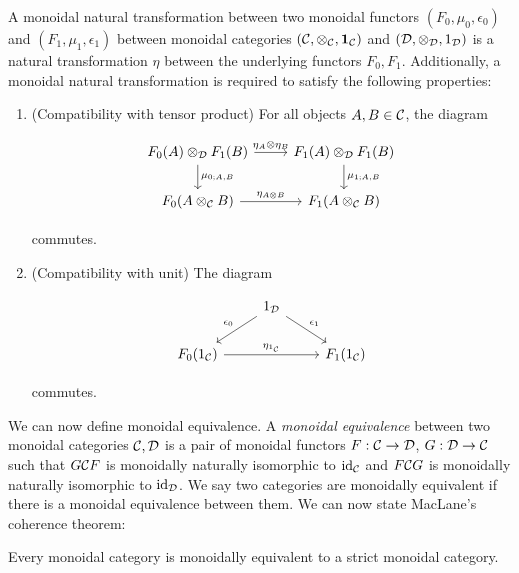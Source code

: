 \begin{defn} A monoidal natural transformation between two monoidal functors $(F_0,\mu_0,\epsilon_0)$ and $(F_1,\mu_1,\epsilon_1)$ between monoidal categories $({\mathcal C},\otimes_{{\mathcal C}},{\mathbf 1}_{{\mathcal C}})$ and $({\mathcal D},\otimes_{{\mathcal D}},1_{{\mathcal D}})$ is a natural transformation $\eta$ between the underlying functors $F_0,F_1$. Additionally, a monoidal natural transformation is required to satisfy the following properties:

\begin{enumerate}
\item (Compatibility with tensor product) For all objects $A,B\in {\mathcal C}$, the diagram

\[\begin{tikzcd}
	{F_0(A)\otimes_{\cD}F_1(B)} & {F_1(A)\otimes_{\cD}F_1(B)} \\
	{F_0(A\otimes_{\cC} B)} & {F_1(A\otimes_{\cC} B)}
	\arrow["{\mu_{0;A,B}}", from=1-1, to=2-1]
	\arrow["{\mu_{1;A,B}}", from=1-2, to=2-2]
	\arrow["{\eta_A\otimes \eta_B}", from=1-1, to=1-2]
	\arrow["{\eta_{A\otimes B}}", from=2-1, to=2-2]
\end{tikzcd}\]

commutes.

\item (Compatibility with unit) The diagram

\[\begin{tikzcd}
	& {1_{\cD}} \\
	{F_0(1_{\cC})} && {F_1(1_{\cC})}
	\arrow["{\eta_{1_{\cC}}}", from=2-1, to=2-3]
	\arrow["{\epsilon_0}"', from=1-2, to=2-1]
	\arrow["{\epsilon_1}", from=1-2, to=2-3]
\end{tikzcd}\]

commutes.
\end{enumerate}

\end{defn}


We can now define monoidal equivalence. A {\em monoidal equivalence} between two monoidal categories ${\mathcal C},{\mathcal D}$ is a pair of monoidal functors $F:{\mathcal C}\to {\mathcal D}$, $G:{\mathcal D}\to {\mathcal C}$ such that $G{\mathcal C} F$ is monoidally naturally isomorphic to $\operatorname{id}_{{\mathcal C}}$ and $F{\mathcal C} G$ is monoidally naturally isomorphic to $\operatorname{id}_{{\mathcal D}}$. We say two categories are monoidally equivalent if there is a monoidal equivalence between them. We can now state MacLane's coherence theorem:

\begin{thrm} Every monoidal category is monoidally equivalent to a strict monoidal category.
\end{thrm}

